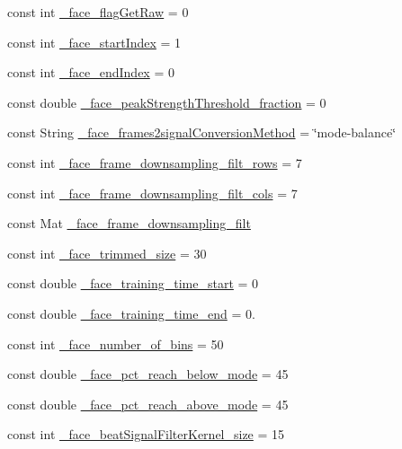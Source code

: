 \begin{DoxyCompactItemize}
\item 
const int \hyperlink{namespace_m_h_r_a6e9575c56ad75e4e165fd62fad98734f}{\+\_\+face\+\_\+flag\+Get\+Raw} = 0
\item 
const int \hyperlink{namespace_m_h_r_a5c705653d488611b87b11e41e4ffbfd5}{\+\_\+face\+\_\+start\+Index} = 1
\item 
const int \hyperlink{namespace_m_h_r_ad45b2867da1e1b69dee3648585a3ad3a}{\+\_\+face\+\_\+end\+Index} = 0
\item 
const double \hyperlink{namespace_m_h_r_adad3be408f5b45234ee745acc33d6ac8}{\+\_\+face\+\_\+peak\+Strength\+Threshold\+\_\+fraction} = 0
\item 
const String \hyperlink{namespace_m_h_r_a634c25b34e7aa6bbb3cfc346964d2f90}{\+\_\+face\+\_\+frames2signal\+Conversion\+Method} = \char`\"{}mode-\/balance\char`\"{}
\item 
const int \hyperlink{namespace_m_h_r_a7fa6df2df062c81344149450be58164a}{\+\_\+face\+\_\+frame\+\_\+downsampling\+\_\+filt\+\_\+rows} = 7
\item 
const int \hyperlink{namespace_m_h_r_ae762029528d214f277ed064282784d3b}{\+\_\+face\+\_\+frame\+\_\+downsampling\+\_\+filt\+\_\+cols} = 7
\item 
const Mat \hyperlink{namespace_m_h_r_a53c978f9017a65e09546b90474f17111}{\+\_\+face\+\_\+frame\+\_\+downsampling\+\_\+filt}
\item 
const int \hyperlink{namespace_m_h_r_ae64aacd3f078b0c1ecfefee56c27e3ce}{\+\_\+face\+\_\+trimmed\+\_\+size} = 30
\item 
const double \hyperlink{namespace_m_h_r_a4ad71fd0cc039551252ae1929fbbfea9}{\+\_\+face\+\_\+training\+\_\+time\+\_\+start} = 0
\item 
const double \hyperlink{namespace_m_h_r_a86e77ed79df316c170e425d131558571}{\+\_\+face\+\_\+training\+\_\+time\+\_\+end} = 0.
\item 
const int \hyperlink{namespace_m_h_r_a2c4c769eba572cf1388059c68e02804a}{\+\_\+face\+\_\+number\+\_\+of\+\_\+bins} = 50
\item 
const double \hyperlink{namespace_m_h_r_ac4235bc51ec51e261f5822920a5886b0}{\+\_\+face\+\_\+pct\+\_\+reach\+\_\+below\+\_\+mode} = 45
\item 
const double \hyperlink{namespace_m_h_r_a50b60319fb33591915a63ce9b618a18c}{\+\_\+face\+\_\+pct\+\_\+reach\+\_\+above\+\_\+mode} = 45
\item 
const int \hyperlink{namespace_m_h_r_a7f9a1a070d8e2c3eb72d79c71b2f468a}{\+\_\+face\+\_\+beat\+Signal\+Filter\+Kernel\+\_\+size} = 15

\end{DoxyCompactItemize}
